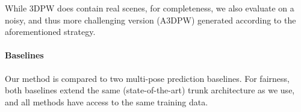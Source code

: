 While 3DPW does contain real scenes, for completeness, we also evaluate on a noisy, and thus more challenging version (A3DPW) generated according to the aforementioned strategy.





\paragraph{Baselines}\label{s:exp_baselines}

Our method is compared to two multi-pose prediction baselines. For fairness, both baselines extend the same (state-of-the-art) trunk architecture as we use, and all methods have access to the same training data. 

